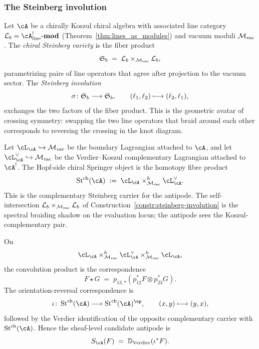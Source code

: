 \subsubsection{The Steinberg involution}

\begin{construction}
\label{constr:steinberg-involution}
Let $\cA$ be a chirally Koszul chiral algebra with associated
line category
$\mathcal{L}_b = \cA^!_{\mathrm{line}}\text{-}\mathbf{mod}$
(Theorem~\ref{thm:lines_as_modules}) and vacuum moduli
${\mathcal{M}_{\mathrm{vac}}}$. The \emph{chiral Steinberg variety} is the fiber
product
\[
\mathfrak{S}_b \;=\; \mathcal{L}_b \times_{{\mathcal{M}_{\mathrm{vac}}}} \mathcal{L}_b,
\]
parametrizing pairs of line operators that agree after
projection to the vacuum sector. The \emph{Steinberg
involution}
\[
\sigma \colon \mathfrak{S}_b \longrightarrow \mathfrak{S}_b,
\qquad
(\ell_1, \ell_2) \longmapsto (\ell_2, \ell_1),
\]
exchanges the two factors of the fiber product. This is the
geometric avatar of crossing symmetry: swapping the two line
operators that braid around each other corresponds to reversing
the crossing in the knot diagram.
\end{construction}

\begin{construction}
\label{constr:chiral-springer-antipode-carrier}
Let $\cL_{\cA}\hookrightarrow\Mvac$ be the boundary Lagrangian
attached to $\cA$, and let
$\cL_{\cA}^{\vee}\hookrightarrow\Mvac$ be the
Verdier--Koszul complementary Lagrangian attached to $\cA^!$.
The Hopf-side chiral Springer object is the homotopy fibre product
\begin{equation}
\label{eq:chiral-springer-antipode-carrier}
\Stch(\cA)
\;:=\;
\cL_{\cA}\times^h_{\Mvac}\cL_{\cA}^{\vee}.
\end{equation}
This is the complementary Steinberg carrier for the antipode.  The
self-intersection
$\mathcal{L}_b\times_{{\mathcal{M}_{\mathrm{vac}}}}\mathcal{L}_b$ of
Construction~\ref{constr:steinberg-involution} is the spectral
braiding shadow on the evaluation locus; the antipode sees the
Koszul-complementary pair.

On
\[
\cL_{\cA}\times^h_{\Mvac}
\cL_{\cA}^{\vee}\times^h_{\Mvac}\cL_{\cA},
\]
the convolution product is the correspondence
\begin{equation}
\label{eq:chiral-springer-convolution}
F\star G
\;=\;
p_{13,*}\!\left(p_{12}^{*}F\otimes p_{23}^{*}G\right).
\end{equation}
The orientation-reversal correspondence is
\[
\iota\colon \Stch(\cA)\longrightarrow \Stch(\cA)^{\op},
\qquad
(x,y)\longmapsto (y,x),
\]
followed by the Verdier identification of the opposite
complementary carrier with \(\Stch(\cA)\).  Hence the sheaf-level
candidate antipode is
\begin{equation}
\label{eq:chiral-springer-verdier-antipode}
S_{\cA}(F)
\;=\;
\mathbb{D}_{\mathrm{Verdier}}(\iota^*F).
\end{equation}
\end{construction}

